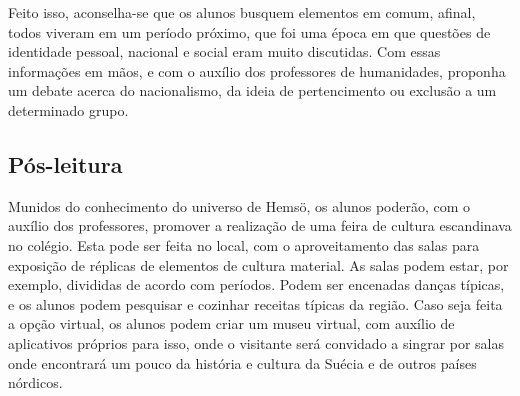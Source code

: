 \documentclass[12pt]{extarticle}
\begin{document}
Feito isso, aconselha-se que os alunos busquem elementos em comum,
afinal, todos viveram em um período próximo, que foi uma época em que
questões de identidade pessoal, nacional e social eram muito discutidas.
Com essas informações em mãos, e com o auxílio dos professores de
humanidades, proponha um debate acerca do nacionalismo, da ideia de
pertencimento ou exclusão a um determinado grupo.

\subsection{Pós-leitura}

Munidos do conhecimento do universo de Hemsö, os alunos
poderão, com o auxílio dos professores, promover a realização de uma
feira de cultura escandinava no colégio. Esta pode ser feita no local,
com o aproveitamento das salas para exposição de réplicas de elementos
de cultura material. As salas podem estar, por exemplo, divididas de
acordo com períodos. Podem ser encenadas danças típicas, e os alunos
podem pesquisar e cozinhar receitas típicas da região. Caso seja feita a
opção virtual, os alunos podem criar um museu virtual, com auxílio de
aplicativos próprios para isso, onde o visitante será convidado a
singrar por salas onde encontrará um pouco da história e cultura da
Suécia e de outros países nórdicos.
\end{document}
